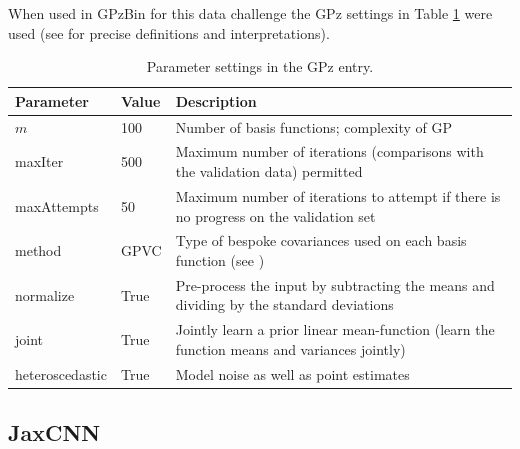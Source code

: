 \documentclass[twocolumn,twocolappendix]{aastex63}
\begin{document}
When used in GPzBin for this data challenge the GPz settings
in Table \ref{table-settings} were used (see
\citealp{Almosallam2016a,Almosallam2016b} for precise definitions and
interpretations).


\begin{table}[]
\begin{center}
    \begin{tabular}{| l | l | l |}
    \hline
    Parameter   &   Value   &   Description\\  
    \hline 
    $m$         &   100     &   Number of basis functions; complexity of GP\\

    maxIter     &   500     &   Maximum number of iterations (comparisons with 
                                the validation data) permitted\\

    maxAttempts &   50      &   Maximum number of iterations to attempt if there 
                                is no progress on the validation set\\

    method      &   GPVC    &   Type of bespoke covariances used on each basis 
                                function (see \citealp{Almosallam2016b})\\

    normalize   &   True    &   Pre-process the input by subtracting the means
                                and dividing by the standard deviations\\

    joint       &   True    &   Jointly learn a prior linear mean-function 
                                (learn the function means and variances 
                                jointly)\\

    heteroscedastic  & True & Model noise as well as point estimates \\
    \hline
    \end{tabular}
\caption{Parameter settings in the GPz entry.}
\end{center}
\label{table-settings}
\end{table}

\subsection{ {\sc JaxCNN} }
\end{document}
